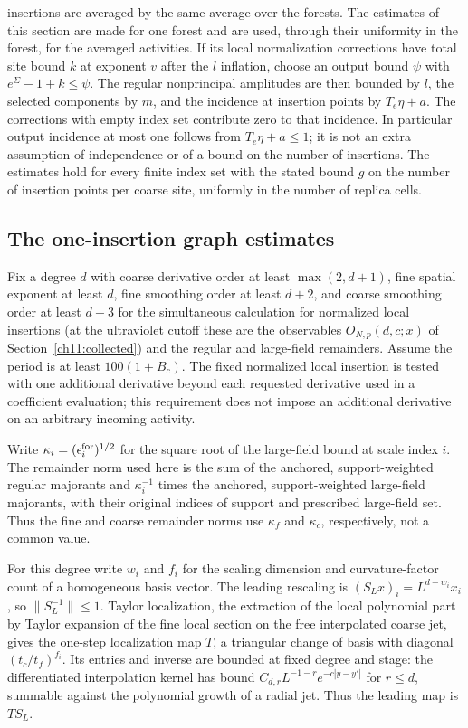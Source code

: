insertions are averaged by the same average over the forests. The estimates of this section are made for one forest and are used, through their uniformity in the forest, for the averaged activities.
If its local normalization corrections have total site bound $k$
at exponent $v$ after the $l$ inflation, choose an output bound
$\psi$ with $e^\Sigma-1+k\le\psi$.
The regular nonprincipal amplitudes are then bounded by $l$, the selected
components by $m$, and the incidence at insertion points by $T_e\eta+a$.
The corrections with empty index set contribute zero to that incidence.
In particular output incidence at most one follows from
$T_e\eta+a\le1$; it is not an extra assumption of independence or of a bound on the number of insertions. The estimates hold for every finite index set with
the stated bound $g$ on the number of insertion points per coarse site, uniformly in the number of replica cells.

\subsection{The one-insertion graph estimates}
\label{ch11:one-graph}

Fix a degree $d$ with coarse derivative order at least
$\max(2,d+1)$, fine spatial exponent at least $d$, fine smoothing order
at least $d+2$, and coarse smoothing order at least $d+3$ for the
simultaneous calculation for normalized local insertions (at the ultraviolet cutoff these are the observables $O_{N,p}(d,c;x)$ of Section~\ref{ch11:collected}) and the regular and large-field remainders.
Assume the period is at least $100(1+B_c)$.
The fixed normalized local insertion is tested with one additional
derivative beyond each requested derivative used in a coefficient evaluation; this requirement
does not impose an additional derivative on an arbitrary incoming
activity.

Write $\kappa_i=(\epsilon_i^{\rm for})^{1/2}$ for the square root
of the large-field bound at scale index $i$.
The remainder norm used here is the sum of the anchored,
support-weighted regular majorants and $\kappa_i^{-1}$ times the
anchored, support-weighted large-field majorants, with their original
indices of support and prescribed large-field set. Thus the fine and coarse remainder norms
use $\kappa_f$ and $\kappa_c$, respectively, not a common value.

For this degree write $w_i$ and $f_i$ for the scaling
dimension and curvature-factor count of a homogeneous basis vector.
The leading rescaling is
$(S_Lx)_i=L^{d-w_i}x_i$, so $\|S_L^{-1}\|\le1$.
Taylor localization, the extraction of the local polynomial part by Taylor expansion of the fine local section on the free interpolated
coarse jet, gives the one-step localization map $T$, a triangular change of basis with diagonal
$(t_c/t_f)^{f_i}$. Its entries and inverse are bounded at fixed
degree and stage: the differentiated interpolation kernel has bound
$C_{d,r}L^{-1-r}e^{-c|y-y'|}$ for $r\le d$, summable against the
polynomial growth of a radial jet. Thus the leading map is $TS_L$.

